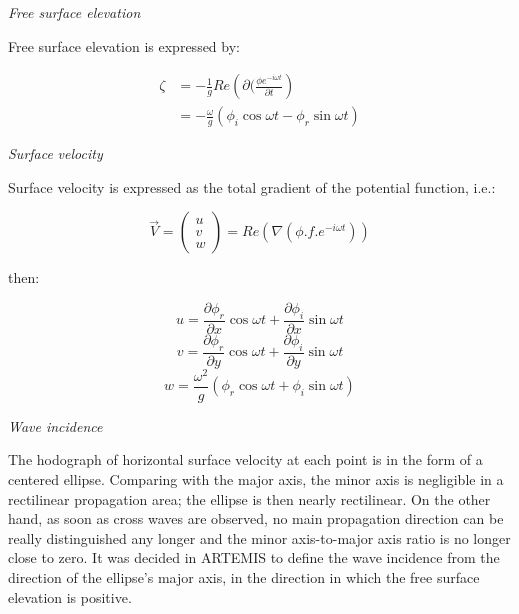 \textit{Free surface elevation}

Free surface elevation is expressed by:

\begin{equation}
  \begin{aligned}
    \zeta & = -\frac{1}{g}Re\left(\partial(\frac{\phi e^{-i\omega t}}{\partial t}\right) \\
          & = - \frac{\omega}{g}(\phi_{i}\cos \omega t - \phi_{r}\sin \omega t)
  \end{aligned}
  \label{eq:3.28}
\end{equation}

\textit{Surface} \textit{velocity}

Surface velocity is expressed as the total gradient of the potential function, i.e.:

\[ \overrightarrow{V} = \left(\begin{matrix} u\\ v\\ w\end{matrix}\right) = Re(\nabla(\phi.f.e^{-i\omega t}))\]

then:

\begin{equation}
  u = \frac{\partial \phi_{r}}{\partial x}\cos\omega t +\frac{\partial \phi_{i}}{\partial x}\sin\omega t
  \label{eq:3.29}
\end{equation}
\begin{equation}
  v = \frac{\partial \phi_{r}}{\partial y}\cos\omega t +\frac{\partial \phi_{i}}{\partial y}\sin\omega t
  \label{eq:3.30}
\end{equation}
\begin{equation}
  w = \frac{\omega^{2}}{g}(\phi_{r}\cos\omega t+\phi_{i}\sin \omega t)
  \label{eq:3.31}
\end{equation}

\textit{Wave incidence}

The hodograph of horizontal surface velocity at each point is in the form of a
centered ellipse. Comparing with the major axis, the minor axis is negligible
in a rectilinear propagation area; the ellipse is then nearly rectilinear. On
the other hand, as soon as cross waves are observed, no main propagation
direction can be really distinguished any longer and the minor axis-to-major
axis ratio is no longer close to zero. It was decided in ARTEMIS to define the
wave incidence from the direction of the ellipse's major axis, in the direction
in which the free surface elevation is positive.

